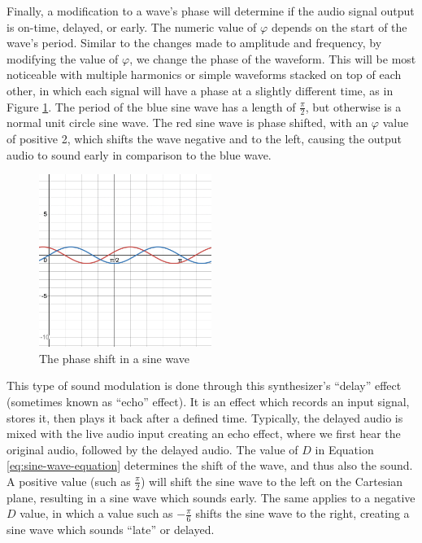 Finally, a modification to a wave's phase will determine if the audio signal output is on-time, delayed, or early. The numeric value of $\varphi$ depends on the start of the wave's period. Similar to the changes made to amplitude and frequency, by modifying the value of $\varphi$, we change the phase of the waveform. This will be most noticeable with multiple harmonics or simple waveforms stacked on top of each other, in which each signal will have a phase at a slightly different time, as in Figure \ref{fig:sine-wave-phase-shift}. The period of the blue sine wave has a length of $\frac{\pi}{2}$, but otherwise is a normal unit circle sine wave. The red sine wave is phase shifted, with an $\varphi$ value of positive 2, which shifts the wave negative and to the left, causing the output audio to sound early in comparison to the blue wave. 

\begin{figure}[ht]
	\centering
	\includegraphics[width=0.5\textwidth]{figures/sine-wave-phase-shift.png}
	\caption{The phase shift in a sine wave}
	\label{fig:sine-wave-phase-shift}
\end{figure}


This type of sound modulation is done through this synthesizer's ``delay'' effect (sometimes known as ``echo'' effect). It is an effect which records an input signal, stores it, then plays it back after a defined time. Typically, the delayed audio is mixed with the live audio input creating an echo effect, where we first hear the original audio, followed by the delayed audio. The value of $D$ in Equation \ref{eq:sine-wave-equation} determines the shift of the wave, and thus also the sound. A positive value (such as $\frac{\pi}{2}$) will shift the sine wave to the left on the Cartesian plane, resulting in a sine wave which sounds early. The same applies to a negative $D$ value, in which a value such as $-\frac{\pi}{6}$ shifts the sine wave to the right, creating a sine wave which sounds ``late'' or delayed.

